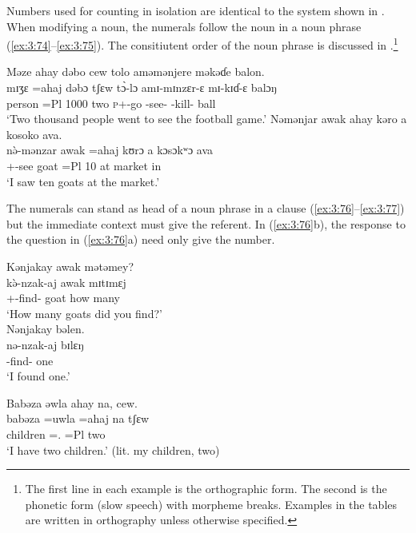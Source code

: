 Numbers used for counting in isolation are identical to the system shown in . When modifying a noun, the numerals follow the noun in a noun phrase (\ref{ex:3:74}--\ref{ex:3:75}). The consitiutent order of the noun phrase is discussed in .\footnote{The first line in each example is the orthographic form. The second is the phonetic form (slow speech) with morpheme breaks. Examples in the tables are written in orthography unless otherwise specified.}

\ea \label{ex:3:74}
Məze  ahay  dəbo  cew  tolo  aməmənjere  məkəɗe  balon.\\
\gll  mɪʒɛ    =ahaj  dəbɔ   tʃɛw  t\`{ɔ}-lɔ    amɪ-mɪnzɛr-ɛ  mɪ-kɪɗ-ɛ    balɔŋ\\
      person  =Pl  1000  two  \textsc{p}+{\PFV}-go  {\DEP}-see-{\CL}  {\NOM}-kill-{\CL}  ball\\
\glt  ‘Two thousand people went to see the football game.’
\z
\clearpage
\ea \label{ex:3:75}
Nəmənjar  awak  ahay  kəro  a  kosoko  ava.\\
\gll  n\`{ə}-mənzar  awak  =ahaj  kʊrɔ  a  kɔsɔkʷɔ  ava\\
      {\oneS}+{\PFV}-see  goat  =Pl  10  at  market  in\\
\glt  ‘I saw ten goats at the market.’
\z

The numerals can stand as head of a noun phrase in a clause (\ref{ex:3:76}--\ref{ex:3:77}) but the immediate context must give the referent. In (\ref{ex:3:76}b), the response to the question in (\ref{ex:3:76}a) need only give the number. 

\ea\label{ex:3:76}
\ea
Kənjakay  awak  mətəmey?  \\
\gll  k\`{ə}-nzak-aj     awak   mɪtɪmɛj  \\
      {\twoS}+{\PFV}-find-{\CL}  goat  {how many}    \\
\glt  ‘How many goats did you find?’   \\
\ex
Nənjakay  bəlen.\\
\gll  nə-nzak-aj   bɪlɛŋ\\
      {\oneS}-find-{\CL}  one\\
\glt  ‘I found one.’
\z\z

\ea \label{ex:3:77}
Babəza  əwla  ahay  na,  cew.\\
\gll  babəza   =uwla    =ahaj  na  tʃɛw\\
      children  ={\oneS}.{\POSS}  =Pl  {\PSP}  two\\
\glt ‘I have two children.’ (lit. my children, two)
\z

